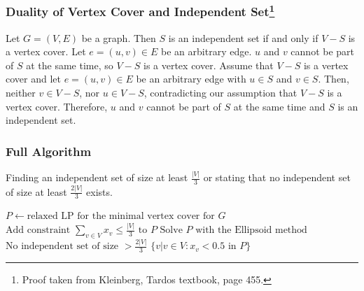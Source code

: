 \documentclass[12pt]{article}
\begin{document}
\subsubsection*{Duality of Vertex Cover and Independent Set\footnote{Proof taken from Kleinberg, Tardos textbook, page 455.}}
Let $G=(V,E)$ be a graph. Then $S$ is an independent set if and only if $V-S$ is a vertex cover. Let $e=(u,v) \in E$ be an arbitrary edge. $u$ and $v$ cannot be part of $S$ at the same time, so $V-S$ is a vertex cover. Assume that $V-S$ is a vertex cover and let $e=(u,v) \in E$ be an arbitrary edge with $u \in S$ and $v \in S$. Then, neither $v \in V-S$, nor $u \in V-S$, contradicting our assumption that $V-S$ is a vertex cover. Therefore, $u$ and $v$ cannot be part of $S$ at the same time and $S$ is an independent set.

\subsubsection*{Full Algorithm}
\begin{algorithm}
  \caption{Finding an independent set of size at least $\frac{|V|}{3}$ or stating that no independent set of size at least $\frac{2 |V|}{3}$ exists.}
  \begin{algorithmic}[1]
		\State $P \gets \mbox{relaxed LP for the minimal vertex cover for $G$}$
		\State $\mbox{Add constraint $\sum_{v \in V} x_v \leq \frac{|V|}{3}$ to $P$}$
		\State $\mbox{Solve $P$ with the Ellipsoid method}$
			\State \Return $\mbox{No independent set of size $> \frac{2 |V|}{3}$}$
		\Else
			\State \Return $\{v \left.\right| v \in V: x_v < 0.5 \mbox{ in $P$}\}$
		\EndIf
    \EndFunction
  \end{algorithmic}
\end{algorithm}
\end{document}
